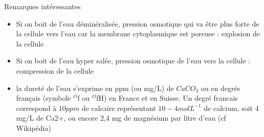 \begin{reportBlock}{Remarques intéressantes}

   \begin{itemize}
       \item Si on boit de l'eau déminéralisée, pression osmotique qui va être plus forte de la cellule vers l'eau car la membrane cytoplasmique est poreuse : explosion de la cellule
       \item Si on boit de l'eau hyper salée, pression osmotique de l'eau vers la cellule : compression de la cellule
       \item la dureté de l'eau s’exprime en ppm (ou mg/L) de $CaCO_3$ ou en degrés français (symbole $^O$f ou  $^O$fH) en France et en Suisse. Un degré francais correspond à $10 ppm$ de calcaire représentant $10-4 mol L^{-1}$ de calcium, soit 4 mg/L de Ca2+, ou encore 2,4 mg de magnésium par litre d’eau (cf Wikipédia)
  \end{itemize}
    
\end{reportBlock}
